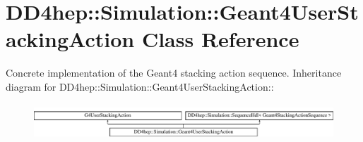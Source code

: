 \hypertarget{class_d_d4hep_1_1_simulation_1_1_geant4_user_stacking_action}{
\section{DD4hep::Simulation::Geant4UserStackingAction Class Reference}
\label{class_d_d4hep_1_1_simulation_1_1_geant4_user_stacking_action}
}


Concrete implementation of the Geant4 stacking action sequence.  
Inheritance diagram for DD4hep::Simulation::Geant4UserStackingAction::\begin{figure}[H]
\begin{center}
\leavevmode
\includegraphics[height=1.35266cm]{class_d_d4hep_1_1_simulation_1_1_geant4_user_stacking_action}
\end{center}
\end{figure}
